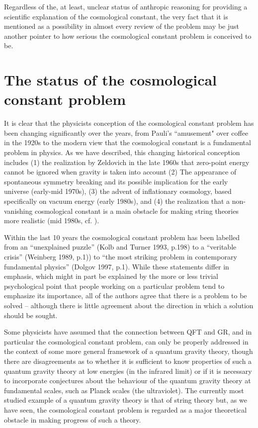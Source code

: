 \documentclass[12pt]{article}
\def\s{\section}
\begin{document}
Regardless of the, at least, unclear status of anthropic reasoning
for providing a scientific explanation of the cosmological
constant, the very fact that it is mentioned as a possibility in
almost every review of the problem may be just another pointer to
how serious the cosmological constant problem is conceived to be. \\

\s{The status of the cosmological constant problem}

It is clear that the physicists conception of the cosmological
constant problem has been changing significantly over the years,
from Pauli's ``amusement" over coffee in the 1920s to the modern
view that the cosmological constant is a fundamental problem in
physics. As we have described, this changing historical conception
includes (1) the realization by Zeldovich in the late 1960s that
zero-point energy cannot be ignored when gravity is taken into
account (2) The appearance of spontaneous symmetry breaking and
its possible implication for the early universe (early-mid 1970s),
(3) the advent of inflationary cosmology, based specifically on
vacuum energy (early 1980s), and (4) the realization that a
non-vanishing cosmological constant is a main obstacle for making
string theories more realistic (mid 1980s, cf. \cite{witten97}).

Within the last 10 years the cosmological constant problem has
been labelled from an ``unexplained puzzle'' (Kolb and Turner
1993, \cite{kolb93} p.198) to a ``veritable crisis'' (Weinberg
1989, \cite{Weinberg89} p.1)) to ``the most striking problem in
contemporary fundamental physics'' (Dolgov 1997, \cite{dolgov97}
p.1). While these statements differ in emphasis, which might in
part be explained by the more or less trivial psychological point
that people working on a particular problem tend to emphasize its
importance, all of the authors agree that there is a problem to be
solved -- although there is little agreement about the direction
in which a solution should be sought.

Some physicists have assumed that the connection between QFT and GR,
and in particular the cosmological constant problem, can only be
properly addressed in the context of some more general framework of a
quantum gravity theory, though there are disagreements as to whether
it is sufficient to know properties of such a quantum gravity theory
at low energies (in the infrared limit) or if it is necessary to
incorporate conjectures about the behaviour of the quantum gravity
theory at fundamental scales, such as Planck scales (the ultraviolet).
The currently most studied example of a quantum gravity theory is that
of string theory but, as we have seen, the cosmological constant
problem is regarded as a major theoretical obstacle in making progress
of such a theory.
\end{document}
